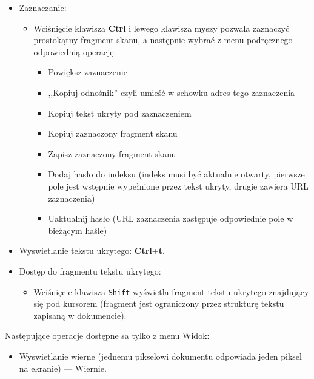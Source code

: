 \documentclass{mwart}
\def\key#1{\textbf{#1}}
\begin{document}
\begin{itemize}
  \item Zaznaczanie:
    \begin{itemize}
    \item Wciśnięcie klawisza \key{Ctrl} i lewego klawisza myszy
      pozwala zaznaczyć prostokątny fragment skanu, a następnie wybrać z
      menu podręcznego odpowiednią operację:
      \begin{itemize}
      \item Powiększ zaznaczenie
      \item ,,Kopiuj odnośnik'' czyli umieść w schowku adres tego zaznaczenia
      \item Kopiuj tekst ukryty pod zaznaczeniem
      \item Kopiuj zaznaczony fragment skanu
      \item Zapisz zaznaczony fragment skanu
      \item Dodaj hasło do indeksu (indeks musi być aktualnie otwarty,
        pierwsze pole jest wstępnie wypełnione przez tekst ukryty,
        drugie zawiera URL zaznaczenia)
      \item Uaktualnij hasło (URL zaznaczenia zastępuje odpowiednie pole w bieżącym haśle)
      \end{itemize}
    \end{itemize}
  \item Wyswietlanie tekstu ukrytego: \key{Ctrl}+\key{t}.
  \item Dostęp do fragmentu tekstu ukrytego:
    \begin{itemize}
    \item Wciśnięcie klawisza \texttt{Shift} wyświetla fragment tekstu
      ukrytego znajdujący się pod kursorem (fragment jest ograniczony
      przez strukturę tekstu zapisaną w dokumencie).
    \end{itemize}
  \end{itemize}
  Następujące operacje dostępne sa tylko z menu \textsf{Widok}:
  \begin{itemize}
  \item Wyswietlanie wierne (jednemu pikselowi dokumentu odpowiada
    jeden piksel na ekranie) --- \textsf{Wiernie}.
  \end{itemize}
\end{document}
